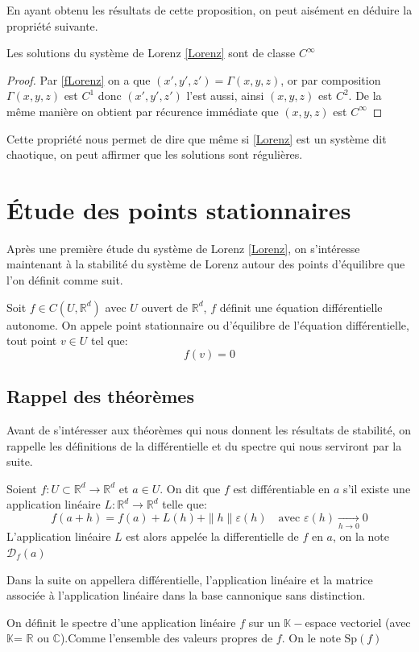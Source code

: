 \documentclass{article}
\newcommand{\R}{\mathbb{R}}
\newtheorem[M , nocut]{prop}{Proposition}[section]
\newtheorem[M , nocut]{definition}{Définition}
\newtheorem[M , nocut]{lemme}{Lemme}
\newtheorem[L , nocut]{thm}{Théoreme}
\newtheorem[M , nocut]{cor}{Corollaire}
\begin{document}
En ayant obtenu les résultats de cette proposition, on peut aisément en déduire la propriété suivante.

\begin{cor}
    Les solutions du système de Lorenz \eqref{Lorenz} sont de classe $C^\infty$
\end{cor}

\begin{proof}
    Par \eqref{fLorenz} on a que $(x',y',z') = \Gamma(x,y,z)$, or par composition $\Gamma(x,y,z)$ est $C^1$ donc $(x',y',z')$ l'est aussi, ainsi $(x,y,z)$ est $C^2$. De la même manière on obtient par récurence immédiate que $(x,y,z)$ est $C^\infty$
\end{proof}

Cette propriété nous permet de dire que même si \eqref{Lorenz} est un système dit chaotique, on peut affirmer que les solutions sont régulières.

\newpage
\section{\'Etude des points stationnaires}

Après une première étude du système de Lorenz \eqref{Lorenz}, on s'intéresse maintenant à la stabilité du système de Lorenz autour des points d'équilibre que l'on définit comme suit.

\begin{definition}
    Soit $f\in C(U,\R^d)$ avec $U$ ouvert de $\R^d$, $f$ définit une équation différentielle autonome.
    On appele point stationnaire ou d'équilibre de l'équation différentielle, tout point $v \in U$ tel que:
    $$ f(v) = 0$$ 
\end{definition}

\subsection{Rappel des théorèmes}
\label{sec:Rappel-des-théorèmes}
Avant de s'intéresser aux théorèmes qui nous donnent les résultats de stabilité, on rappelle les définitions de la différentielle et du spectre qui nous serviront par la suite.
\begin{definition}
    Soient $f:U\subset \R^d \to \R^d$ et $a\in U$. On dit que $f$ est différentiable en $a$ s'il existe une application linéaire $L:\R^d\to\R^d$ telle que:
    $$f(a+h) = f(a) + L(h) + \|h\|\varepsilon(h)\quad \text{avec }\varepsilon(h)\xrightarrow[h\to 0]{}0$$ 
    L'application linéaire $L$ est alors appelée la differentielle de $f$ en $a$, on la note $\mathcal{D}_f(a)$
\end{definition}
\begin{example}[Remarque]
    Dans la suite on appellera différentielle, l'application linéaire et la matrice associée à l'application linéaire dans la base cannonique sans distinction.
\end{example}
\begin{definition}
    On définit le spectre d'une application linéaire $f$ sur un $\mathbb{K}-$espace vectoriel (avec $\mathbb{K}$= $\R$ ou $\mathbb{C}$).Comme l'ensemble des valeurs propres de $f$. On le note $\mathrm{Sp}(f)$
\end{definition}
\end{document}
